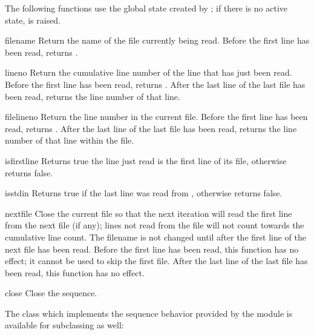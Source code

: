The following functions use the global state created by
; if there is no active state,
 is raised.

\begin{funcdesc}{filename}{}
  Return the name of the file currently being read.  Before the first
  line has been read, returns .
\end{funcdesc}

\begin{funcdesc}{lineno}{}
  Return the cumulative line number of the line that has just been
  read.  Before the first line has been read, returns .  After
  the last line of the last file has been read, returns the line
  number of that line.
\end{funcdesc}

\begin{funcdesc}{filelineno}{}
  Return the line number in the current file.  Before the first line
  has been read, returns .  After the last line of the last
  file has been read, returns the line number of that line within the
  file.
\end{funcdesc}

\begin{funcdesc}{isfirstline}{}
  Returns true the line just read is the first line of its file,
  otherwise returns false.
\end{funcdesc}

\begin{funcdesc}{isstdin}{}
  Returns true if the last line was read from ,
  otherwise returns false.
\end{funcdesc}

\begin{funcdesc}{nextfile}{}
  Close the current file so that the next iteration will read the
  first line from the next file (if any); lines not read from the file
  will not count towards the cumulative line count.  The filename is
  not changed until after the first line of the next file has been
  read.  Before the first line has been read, this function has no
  effect; it cannot be used to skip the first file.  After the last
  line of the last file has been read, this function has no effect.
\end{funcdesc}

\begin{funcdesc}{close}{}
  Close the sequence.
\end{funcdesc}


The class which implements the sequence behavior provided by the
module is available for subclassing as well:


